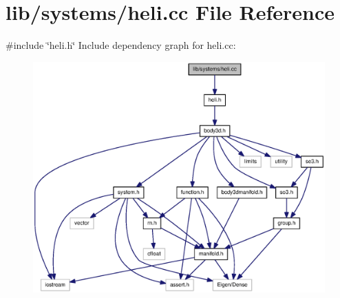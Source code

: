 \section{lib/systems/heli.cc \-File \-Reference}
\label{heli_8cc}
{\ttfamily \#include \char`\"{}heli.\-h\char`\"{}}\*
\-Include dependency graph for heli.\-cc\-:\nopagebreak
\begin{figure}[H]
\begin{center}
\leavevmode
\includegraphics[width=350pt]{heli_8cc__incl}
\end{center}
\end{figure}
